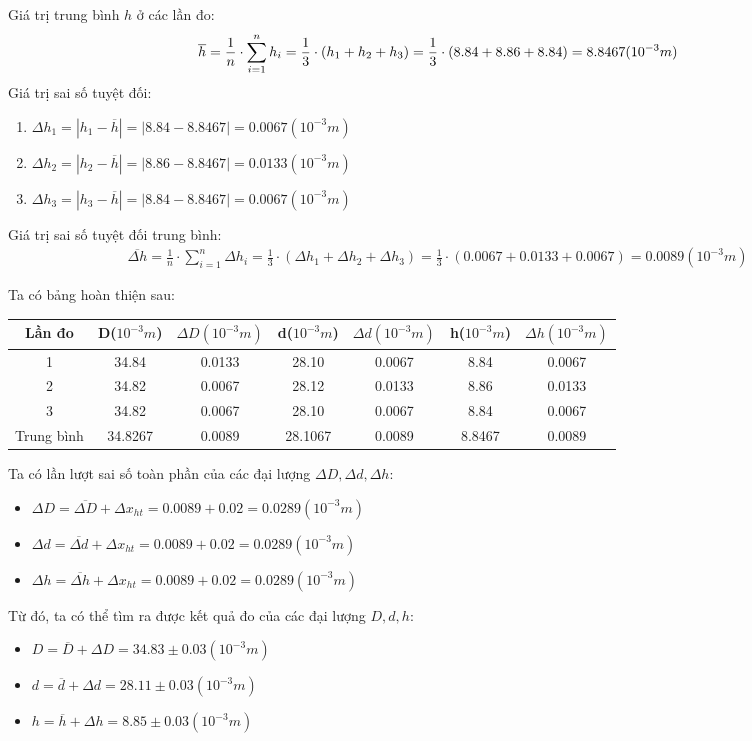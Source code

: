 \documentclass{article}
\begin{document}
Giá trị trung bình $h$ ở các lần đo:
\begin{align*}
    \centering
    \overline{h} = \frac{1}{n}\cdot\sum_{i=1}^{n}h_i = \frac{1}{3}\cdot(h_1 + h_2 + h_3) = \frac{1}{3}\cdot(8.84 + 8.86 + 8.84) = 8.8467 (10^{-3} m)
\end{align*}
Giá trị sai số tuyệt đối:
\begin{enumerate}
    \item $\Delta h_1 = |h_1 - \overline{h}| = |8.84 - 8.8467| = 0.0067 (10^{-3}m)$
    \item $\Delta h_2 = |h_2 - \overline{h}| = |8.86 - 8.8467| = 0.0133 (10^{-3}m)$
    \item $\Delta h_3 = |h_3 - \overline{h}| = |8.84 - 8.8467| = 0.0067 (10^{-3}m)$
\end{enumerate}
Giá trị sai số tuyệt đối trung bình:
\begin{align*}
    \overline{\Delta h} = \frac{1}{n}\cdot\sum_{i=1}^{n}\Delta h_i = \frac{1}{3}\cdot(\Delta h_1 + \Delta h_2 + \Delta h_3) = \frac{1}{3}\cdot(0.0067+ 0.0133 + 0.0067) = 0.0089 (10^{-3} m)
\end{align*}

Ta có bảng hoàn thiện sau:
\begin{center}
    \begin{tabular}{|c|c|c|c|c|c|c|}
        \hline
        Lần đo & D($10^{-3} m$) & $\Delta D(10^{-3} m)$ & d($10^{-3} m$) & $\Delta d(10^{-3} m)$ &  h($10^{-3} m$) & $\Delta h(10^{-3} m)$\\
        \hline
        1 & 34.84 & 0.0133 & 28.10 & 0.0067 & 8.84 & 0.0067\\
        \hline
        2 & 34.82 & 0.0067 & 28.12 & 0.0133 & 8.86 & 0.0133\\
        \hline 
        3 & 34.82 & 0.0067 & 28.10 & 0.0067 & 8.84 & 0.0067\\
        \hline
        Trung bình & 34.8267 & 0.0089 & 28.1067 & 0.0089 & 8.8467 & 0.0089 \\
        \hline
    \end{tabular}
\end{center}

Ta có lần lượt sai số toàn phần của các đại lượng $\Delta D, \Delta d, \Delta h$:
\begin{itemize}
    \item $\Delta D = \overline{\Delta D} + \Delta x_{ht} = 0.0089 + 0.02 = 0.0289(10^{-3} m)$
    \item $\Delta d = \overline{\Delta d} + \Delta x_{ht} = 0.0089 + 0.02 = 0.0289(10^{-3} m)$
    \item $\Delta h = \overline{\Delta h} + \Delta x_{ht} = 0.0089 + 0.02 = 0.0289(10^{-3} m)$ 
\end{itemize}
Từ đó, ta có thể tìm ra được kết quả đo của các đại lượng $D, d, h$:
\begin{itemize}
    \item $D = \overline{D} + \Delta D = 34.83 \pm 0.03 (10^{-3} m)$
    \item $d = \overline{d} + \Delta d = 28.11 \pm 0.03 (10^{-3} m)$
    \item $h = \overline{h} + \Delta h = 8.85 \pm 0.03 (10^{-3} m)$
\end{itemize}
\end{document}

